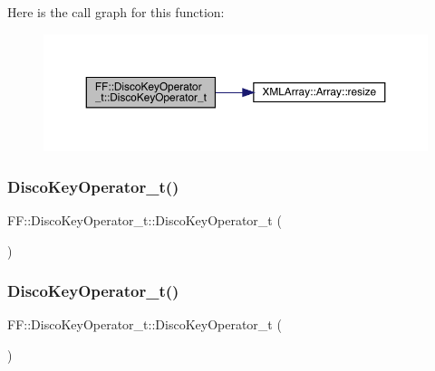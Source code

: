 Here is the call graph for this function\+:\nopagebreak
\begin{figure}[H]
\begin{center}
\leavevmode
\includegraphics[width=350pt]{dc/d42/structFF_1_1DiscoKeyOperator__t_ab4dabc722e586bb004065179dc9b4369_cgraph}
\end{center}
\end{figure}
\mbox{\label{structFF_1_1DiscoKeyOperator__t_ab4dabc722e586bb004065179dc9b4369}} 
\subsubsection{\texorpdfstring{DiscoKeyOperator\_t()}{DiscoKeyOperator\_t()}\hspace{0.1cm}{\footnotesize\ttfamily [2/3]}}
{\footnotesize\ttfamily F\+F\+::\+Disco\+Key\+Operator\+\_\+t\+::\+Disco\+Key\+Operator\+\_\+t (\begin{DoxyParamCaption}{ }\end{DoxyParamCaption})\hspace{0.3cm}{\ttfamily [inline]}}

\mbox{\label{structFF_1_1DiscoKeyOperator__t_ab4dabc722e586bb004065179dc9b4369}} 
\subsubsection{\texorpdfstring{DiscoKeyOperator\_t()}{DiscoKeyOperator\_t()}\hspace{0.1cm}{\footnotesize\ttfamily [3/3]}}
{\footnotesize\ttfamily F\+F\+::\+Disco\+Key\+Operator\+\_\+t\+::\+Disco\+Key\+Operator\+\_\+t (\begin{DoxyParamCaption}{ }\end{DoxyParamCaption})\hspace{0.3cm}{\ttfamily [inline]}}



